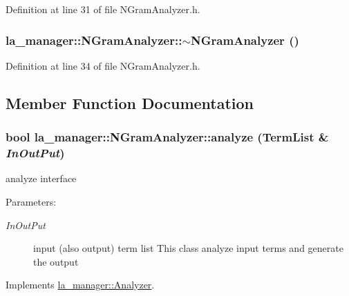 Definition at line 31 of file NGramAnalyzer.h.\hypertarget{classla__manager_1_1NGramAnalyzer_e0de14f9762805085a4d09772c0c50f5}{
\subsubsection[{$\sim$NGramAnalyzer}]{\setlength{\rightskip}{0pt plus 5cm}la\_\-manager::NGramAnalyzer::$\sim$NGramAnalyzer ()}}
\label{classla__manager_1_1NGramAnalyzer_e0de14f9762805085a4d09772c0c50f5}




Definition at line 34 of file NGramAnalyzer.h.

\subsection{Member Function Documentation}
\hypertarget{classla__manager_1_1NGramAnalyzer_9774217127e1d89b57ff5aded31df290}{
\subsubsection[{analyze}]{\setlength{\rightskip}{0pt plus 5cm}bool la\_\-manager::NGramAnalyzer::analyze ({\bf TermList} \& {\em InOutPut})}}
\label{classla__manager_1_1NGramAnalyzer_9774217127e1d89b57ff5aded31df290}


analyze interface 

\begin{Desc}
\item[Parameters:]
\begin{description}
\item[{\em InOutPut}]input (also output) term list This class analyze input terms and generate the output \end{description}
\end{Desc}


Implements \hyperlink{classla__manager_1_1Analyzer_23414b773ec2070957e9aa3d6a7d8b78}{la\_\-manager::Analyzer}.


